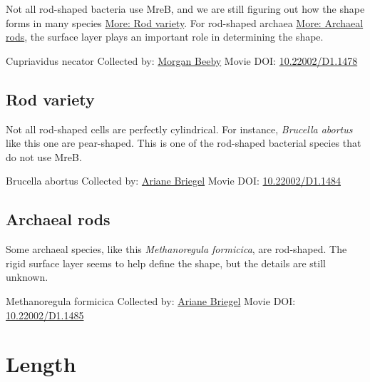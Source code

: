 \documentclass[]{tufte-book}
\begin{document}
Not all rod-shaped bacteria use MreB, and we are still figuring out how the shape forms in many species \protect\hyperlink{Rod_variety}{More: Rod variety}. For rod-shaped archaea \protect\hyperlink{Archaeal_rods}{More: Archaeal rods}, the surface layer plays an important role in determining the shape.



\hypertarget{htmlwidget-a0f01960a5e02da74201}{}

\label{fig:3-2}Cupriavidus necator Collected by: \protect\hyperlink{morgan_beeby}{Morgan Beeby} Movie DOI: \href{https://doi.org/10.22002/D1.1478}{10.22002/D1.1478}

\hypertarget{Rod_variety}{%
\subsection{Rod variety}\label{Rod_variety}}

Not all rod-shaped cells are perfectly cylindrical. For instance, \emph{Brucella abortus} like this one are pear-shaped. This is one of the rod-shaped bacterial species that do not use MreB.



\hypertarget{htmlwidget-d30b5823da855239541d}{}

\label{fig:3-2a}Brucella abortus Collected by: \protect\hyperlink{ariane_briegel}{Ariane Briegel} Movie DOI: \href{https://doi.org/10.22002/D1.1484}{10.22002/D1.1484}

\hypertarget{Archaeal_rods}{%
\subsection{Archaeal rods}\label{Archaeal_rods}}

Some archaeal species, like this \emph{Methanoregula formicica}, are rod-shaped. The rigid surface layer seems to help define the shape, but the details are still unknown.



\hypertarget{htmlwidget-155c3c7d66dd07ad53f4}{}

\label{fig:3-2b}Methanoregula formicica Collected by: \protect\hyperlink{ariane_briegel}{Ariane Briegel} Movie DOI: \href{https://doi.org/10.22002/D1.1485}{10.22002/D1.1485}

\hypertarget{length}{%
\section{Length}\label{length}}
\end{document}
